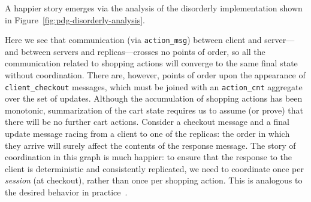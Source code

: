 A happier story emerges via the analysis of the disorderly implementation
shown in Figure~\ref{fig:pdg-disorderly-analysis}.

Here we see that communication (via \texttt{action\_msg}) between client and server---and between servers and replicas---crosses no points of order, so all the
communication related to shopping actions will converge to the same final state without coordination.
There are, however, points of order upon the appearance of \texttt{client\_checkout}
messages, which must be joined with an \texttt{action\_cnt} aggregate over the set of updates.  Although the 
accumulation of shopping actions has been monotonic, summarization of the cart state
requires us to assume (or prove) that there will be no further cart actions.
Consider a checkout message and a final update message racing from a client
to one of the replicas: the order in which they arrive will surely affect
the contents of the response message.  
The story of coordination in this graph is much happier: to
ensure that the response to the client is deterministic and consistently replicated, we need to coordinate once per {\em session} (at checkout), rather than once per shopping action.  This is analogous to the desired behavior in practice~\cite{quicksand}.
%

